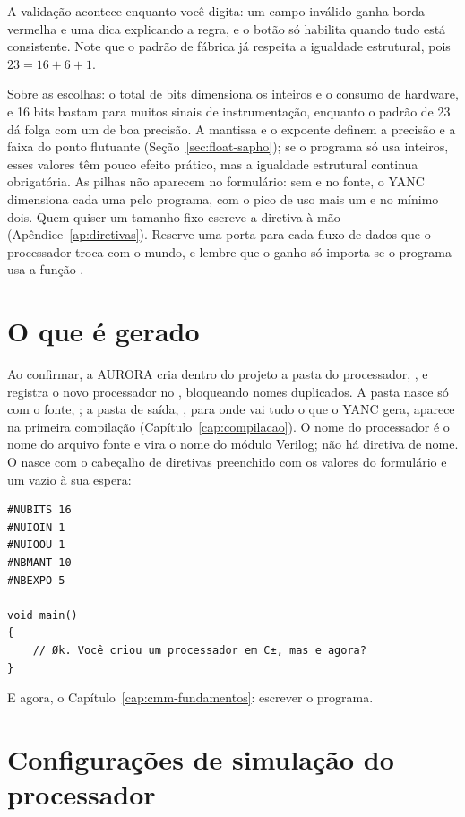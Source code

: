 A validação acontece enquanto você digita: um campo inválido ganha borda vermelha e uma dica explicando a regra, e o botão  só habilita quando tudo está consistente. Note que o padrão de fábrica já respeita a igualdade estrutural, pois $23 = 16 + 6 + 1$.

Sobre as escolhas: o total de bits dimensiona os inteiros e o consumo de hardware, e 16 bits bastam para muitos sinais de instrumentação, enquanto o padrão de 23 dá folga com um  de boa precisão. A mantissa e o expoente definem a precisão e a faixa do ponto flutuante (Seção~\ref{sec:float-sapho}); se o programa só usa inteiros, esses valores têm pouco efeito prático, mas a igualdade estrutural continua obrigatória. As pilhas não aparecem no formulário: sem  e  no fonte, o YANC dimensiona cada uma pelo programa, com o pico de uso mais um e no mínimo dois. Quem quiser um tamanho fixo escreve a diretiva à mão (Apêndice~\ref{ap:diretivas}). Reserve uma porta para cada fluxo de dados que o processador troca com o mundo, e lembre que o ganho só importa se o programa usa a função .

\section{O que é gerado}

Ao confirmar, a AURORA cria dentro do projeto a pasta do processador, , e registra o novo processador no , bloqueando nomes duplicados. A pasta nasce só com o fonte, ; a pasta de saída, , para onde vai tudo o que o YANC gera, aparece na primeira compilação (Capítulo~\ref{cap:compilacao}). O nome do processador é o nome do arquivo fonte e vira o nome do módulo Verilog; não há diretiva de nome. O  nasce com o cabeçalho de diretivas preenchido com os valores do formulário e um  vazio à sua espera:

\begin{lstlisting}[style=cmm]
#NUBITS 16
#NUIOIN 1
#NUIOOU 1
#NBMANT 10
#NBEXPO 5

void main()
{
    // Øk. Você criou um processador em C±, mas e agora?
}
\end{lstlisting}

E agora, o Capítulo~\ref{cap:cmm-fundamentos}: escrever o programa.

\section{Configurações de simulação do processador}
\label{sec:proc-config}

